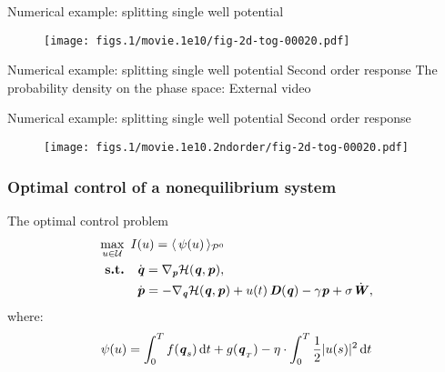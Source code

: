 \documentclass[fleqn]{beamer}
\newcommand{\bluec}[1]{{\color{blue} #1}}
\newcommand{\vect}[1]{\textbf{\textit{#1}}}
\newcommand{\dd}[0]{\textrm{d}}
\newcommand{\fe}{u}
\newcommand{\mh}{\mathcal H}
\newcommand{\pathmeas}{\mathcal P}
\begin{document}
\begin{frame}{Numerical example: splitting single well potential}
  \begin{figure}
    \texttt{[image: figs.1/movie.1e10/fig-2d-tog-00020.pdf]}
  \end{figure}  
\end{frame}


\begin{frame}{Numerical example: splitting single well potential}
  {Second order response}
  The probability density on the phase space: External video
  \begin{figure}[ht]
  \end{figure}
\end{frame}

\begin{frame}{Numerical example: splitting single well potential}
  {Second order response}
  \begin{figure}
    \texttt{[image: figs.1/movie.1e10.2ndorder/fig-2d-tog-00020.pdf]}
  \end{figure}  
\end{frame}


\begin{frame}
  \frametitle{{Optimal control of a nonequilibrium system}}
  The optimal control problem
  \bluec{
    \begin{align*}
      \max_{u\in\mathcal U} \ I&(u) = \langle\, \psi (u) \,\rangle_{\pathmeas^0}\\
      \textbf{s.t.} \quad&
        \dot{\vect q}  = \nabla_{\vect p}\mh(\vect q,\vect p), \\
        &\dot{\vect p}  =- \nabla_{\vect q}\mh(\vect q,\vect p)
        + \fe(t)\, \vect D(\vect q)
        - \gamma\vect p
        + \sigma\dot{\vect W},      
    \end{align*}
  }
  where:
  \bluec{
    \begin{align*}
      \psi(u) =
      \int_0^T f(\vect q_s)\,\dd t + g(\vect q_{_T}) 
      - \eta\cdot\int_0^T\frac12\vert u(s)\vert^2\, \dd t 
    \end{align*}
  }
\end{frame}
\end{document}
